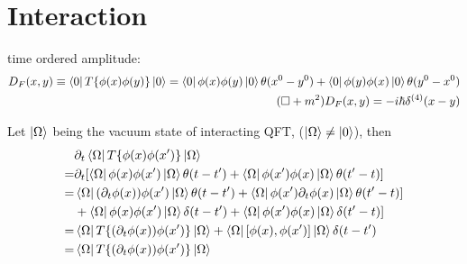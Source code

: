 \section{Interaction}

time ordered amplitude: 
\[
    \begin{aligned}
	D_F(x,y) \equiv \bra{0}T\{\phi(x)\phi(y)\}\ket{0} = \bra{0}\phi(x)\phi(y)\ket{0}\theta(x^0-y^0) + \bra{0}\phi(y)\phi(x)\ket{0}\theta(y^0-x^0)     \\
	(\Box + m^2)D_F(x,y) = -i\hbar\delta^{(4)}(x-y)
    \end{aligned}
    \]

Let $\ket{\Omega}$ being the vacuum state of interacting QFT, ($\ket{\Omega} \neq \ket{0}$), then
\[
    \begin{aligned}
	&\partial_t\bra{\Omega}T\{\phi(x)\phi(x')\}\ket{\Omega}	    \\
	=& \partial_t[\bra{\Omega}\phi(x)\phi(x')\ket{\Omega}\theta(t-t') + \bra{\Omega}\phi(x')\phi(x)\ket{\Omega}\theta(t'-t)]   \\
	=& \bra{\Omega}(\partial_t\phi(x))\phi(x')\ket{\Omega}\theta(t-t') + \bra{\Omega}\phi(x')\partial_t\phi(x)\ket{\Omega}\theta(t'-t)]   \\
	&+ \bra{\Omega}\phi(x)\phi(x')\ket{\Omega}\delta(t-t') + \bra{\Omega}\phi(x')\phi(x)\ket{\Omega}\delta(t'-t)]   \\
	=& \bra{\Omega}T\{(\partial_t\phi(x))\phi(x')\}\ket{\Omega} + \bra{\Omega}[\phi(x), \phi(x')]\ket{\Omega}\delta(t-t')	\\
	=& \bra{\Omega}T\{(\partial_t\phi(x))\phi(x')\}\ket{\Omega} \\
    \end{aligned}
    \]


